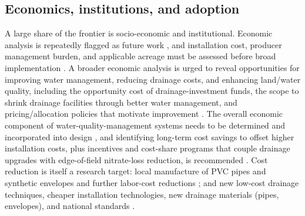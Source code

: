 \subsection{Economics, institutions, and adoption}
A large share of the frontier is socio-economic and institutional. Economic analysis is repeatedly flagged as future work \parencite{Kladivko2005,Saadat2017,Manik2019}, and installation cost, producer management burden, and applicable acreage must be assessed before broad implementation \parencite{Helmers2012}. A broader economic analysis is urged to reveal opportunities for improving water management, reducing drainage costs, and enhancing land/water quality, including the opportunity cost of drainage-investment funds, the scope to shrink drainage facilities through better water management, and pricing/allocation policies that motivate improvement \parencite{Wichelns2002}. The overall economic component of water-quality-management systems needs to be determined and incorporated into design \parencite{THOMAS1995}, and identifying long-term cost savings to offset higher installation costs, plus incentives and cost-share programs that couple drainage upgrades with edge-of-field nitrate-loss reduction, is recommended \parencite{Castellano2019}. Cost reduction is itself a research target: local manufacture of PVC pipes and synthetic envelopes and further labor-cost reductions \parencite{Datta2002}; and new low-cost drainage techniques, cheaper installation technologies, new drainage materials (pipes, envelopes), and national standards \parencite{Yannopoulos2020}.


